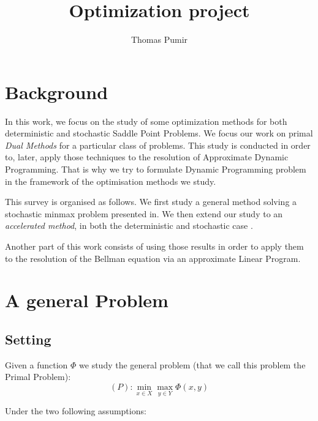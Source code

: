 \documentclass[10pt]{article}
\begin{document}
\title{Optimization project}
\author{Thomas Pumir}
\maketitle
{}

\newcommand{\mb}[1]{ \mathbf{ #1}}
\newcommand{\hmb}[1]{ \hat{\mathbf{ #1}}}
\newcommand{\bb}[1]{\mathbb{ #1}}
\newcommand{\mc}[1]{\mathcal{ #1}}
\newtheorem{thm}{Theorem}
\newtheorem{rmk}{Remark}
\newtheorem{cor}{Corrolary}
\newtheorem{asmp}{Assumption}
\newtheorem{Def}{Definition}


\section{Background}

In this work, we focus on the study of some optimization methods for both deterministic and stochastic Saddle Point Problems.
We focus our work on primal \emph{Dual Methods} for a particular class of problems.
This study is conducted in order to, later, apply those techniques to the resolution of Approximate Dynamic Programming.
That is why we try to formulate Dynamic Programming problem in the framework of the optimisation methods we study.

This survey is organised as follows. We first study a general method solving a  stochastic minmax problem presented in\cite{NemirovskiRubinstein}.
We then extend our study to an \emph{accelerated method}, in both the deterministic \cite{ChambollePock} and stochastic case \cite{ChenLanOuyang}.

Another part of this work consists of using those results in order to apply them to the resolution of the Bellman equation via  an approximate Linear Program.



\section{A general Problem}

\subsection{Setting}

Given a function $\Phi$ we study the general problem (that we call this problem the Primal Problem):
$$
\boxed{ (P): \min_{x \in X}\max_{y \in Y} \Phi(x,y) }
$$

Under the two following assumptions:
\end{document}
